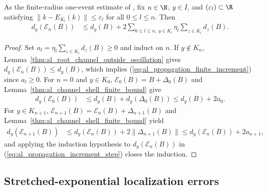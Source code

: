 \begin{lemma}
    \label{thm:al_channel_finite_increment}
    \leanok
    As the finite-radius one-event estimate of
    \cite[Section~10]{OpenAI2026AreaLaw}, fix $n\in\N$, $y\in I$, and
    $(\varepsilon_l)\subset\R$ satisfying
    $\|k-E_{K_l}(k)\|\le\varepsilon_l$ for all $0\le l\le n$. Then
    \begin{align}
        \label{eq:al_propagation_finite_increment}
        d_y(\mathcal E_n(B))
         & \le d_y(B)+2\sum_{0\le l\le n,\ y\in K_l}
        \eta_l\sum_{z\in K_l}d_z(B).
    \end{align}
\end{lemma}
\begin{proof}
    \leanok
    Set $a_l=\eta_l\sum_{z\in K_l}d_z(B)\ge0$ and induct on $n$. If
    $y\notin K_n$, Lemma~\ref{thm:al_root_channel_outside_oscillation} gives
    $d_y(\mathcal E_n(B))\le d_y(B)$, which implies
    (\ref{eq:al_propagation_finite_increment}) since $a_l\ge0$. For $n=0$ and
    $y\in K_0$, $\mathcal E_0(B)=B+\Delta_0(B)$ and
    Lemma~\ref{thm:al_channel_shell_finite_bound} give
    \begin{align}
        d_y(\mathcal E_0(B))
         & \le d_y(B)+d_y(\Delta_0(B))\le d_y(B)+2a_0.
        \label{eq:al_propagation_increment_zero}
    \end{align}
    For $y\in K_{n+1}$, $\mathcal E_{n+1}(B)=\mathcal E_n(B)+\Delta_{n+1}(B)$
    and Lemma~\ref{thm:al_channel_shell_finite_bound} yield
    \begin{align}
        d_y(\mathcal E_{n+1}(B))
         & \le d_y(\mathcal E_n(B))+2\|\Delta_{n+1}(B)\|
        \le d_y(\mathcal E_n(B))+2a_{n+1},
        \label{eq:al_propagation_increment_step}
    \end{align}
    and applying the induction hypothesis to $d_y(\mathcal E_n(B))$ in
    (\ref{eq:al_propagation_increment_step}) closes the induction.
\end{proof}

\subsection{Stretched-exponential localization errors}

